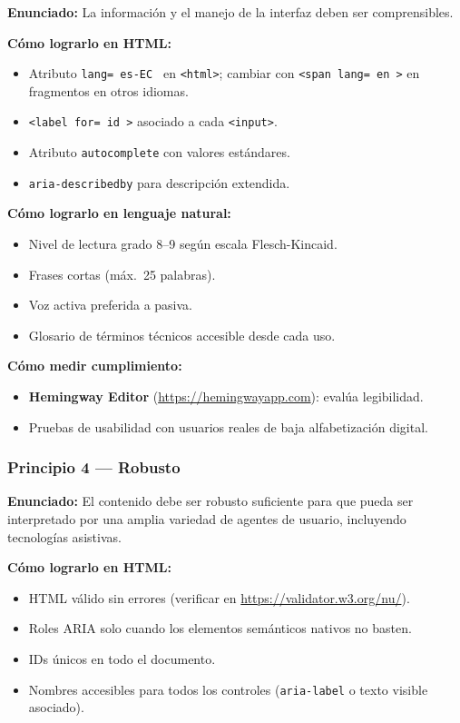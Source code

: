 \documentclass[11pt,a4paper,openany]{book}
\begin{document}
\textbf{Enunciado:} La información y el manejo de la interfaz deben
ser comprensibles.

\textbf{Cómo lograrlo en HTML:}
\begin{itemize}
\item Atributo \texttt{lang= es-EC } en \texttt{<html>}; cambiar con
\texttt{<span lang= en >} en fragmentos en otros idiomas.
\item \texttt{<label for= id >} asociado a cada \texttt{<input>}.
\item Atributo \texttt{autocomplete} con valores estándares.
\item \texttt{aria-describedby} para descripción extendida.
\end{itemize}

\textbf{Cómo lograrlo en lenguaje natural:}
\begin{itemize}
\item Nivel de lectura grado 8--9 según escala Flesch-Kincaid.
\item Frases cortas (máx.\ 25 palabras).
\item Voz activa preferida a pasiva.
\item Glosario de términos técnicos accesible desde cada uso.
\end{itemize}

\textbf{Cómo medir cumplimiento:}
\begin{itemize}
\item \textbf{Hemingway Editor} (\url{https://hemingwayapp.com}):
evalúa legibilidad.
\item Pruebas de usabilidad con usuarios reales de baja
alfabetización digital.
\end{itemize}

\subsubsection{Principio 4 --- Robusto}

\textbf{Enunciado:} El contenido debe ser robusto suficiente para que
pueda ser interpretado por una amplia variedad de agentes de usuario,
incluyendo tecnologías asistivas.

\textbf{Cómo lograrlo en HTML:}
\begin{itemize}
\item HTML válido sin errores (verificar en
\url{https://validator.w3.org/nu/}).
\item Roles ARIA solo cuando los elementos semánticos nativos no
basten.
\item IDs únicos en todo el documento.
\item Nombres accesibles para todos los controles
(\texttt{aria-label} o texto visible asociado).
\end{itemize}
\end{document}
